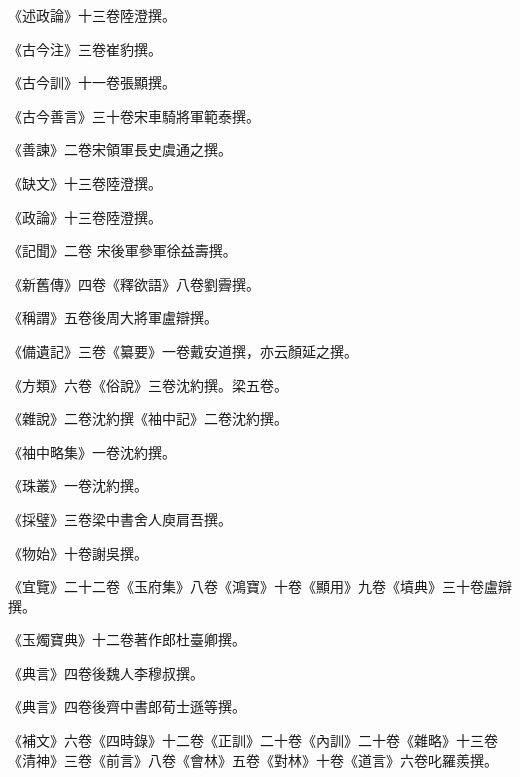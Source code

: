 \begin{pinyinscope}
 《述政論》十三卷陸澄撰。



 《古今注》三卷崔豹撰。



 《古今訓》十一卷張顯撰。



 《古今善言》三十卷宋車騎將軍範泰撰。



 《善諫》二卷宋領軍長史虞通之撰。



 《缺文》十三卷陸澄撰。



 《政論》十三卷陸澄撰。



 《記聞》二卷
 宋後軍參軍徐益壽撰。



 《新舊傳》四卷《釋欲語》八卷劉霽撰。



 《稱謂》五卷後周大將軍盧辯撰。



 《備遺記》三卷《纂要》一卷戴安道撰，亦云顏延之撰。



 《方類》六卷《俗說》三卷沈約撰。梁五卷。



 《雜說》二卷沈約撰《袖中記》二卷沈約撰。



 《袖中略集》一卷沈約撰。



 《珠叢》一卷沈約撰。



 《採璧》三卷梁中書舍人庾肩吾撰。



 《物始》十卷謝吳撰。



 《宜覽》二十二卷《玉府集》八卷《鴻寶》十卷《顯用》九卷《墳典》三十卷盧辯撰。



 《玉燭寶典》十二卷著作郎杜臺卿撰。



 《典言》四卷後魏人李穆叔撰。



 《典言》四卷後齊中書郎荀士遜等撰。



 《補文》六卷《四時錄》十二卷《正訓》二十卷《內訓》二十卷《雜略》十三卷《清神》三卷《前言》八卷《會林》五卷《對林》十卷《道言》六卷叱羅羨撰。




\end{pinyinscope}
